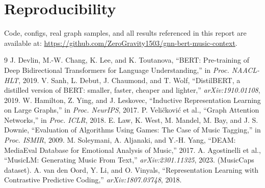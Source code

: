 \documentclass[conference]{IEEEtran}
\begin{document}
\section{Reproducibility}
Code, configs, real graph samples, and all results referenced in this
report are available at: \url{https://github.com/ZeroGravity1503/gnn-bert-music-context}.

\begin{thebibliography}{9}
 J. Devlin, M.-W. Chang, K. Lee, and K. Toutanova, ``BERT: Pre-training of Deep Bidirectional Transformers for Language Understanding,'' in \textit{Proc. NAACL-HLT}, 2019.
 V. Sanh, L. Debut, J. Chaumond, and T. Wolf, ``DistilBERT, a distilled version of BERT: smaller, faster, cheaper and lighter,'' \textit{arXiv:1910.01108}, 2019.
 W. Hamilton, Z. Ying, and J. Leskovec, ``Inductive Representation Learning on Large Graphs,'' in \textit{Proc. NeurIPS}, 2017.
 P. Veli\v{c}kovi\'{c} et al., ``Graph Attention Networks,'' in \textit{Proc. ICLR}, 2018.
 E. Law, K. West, M. Mandel, M. Bay, and J. S. Downie, ``Evaluation of Algorithms Using Games: The Case of Music Tagging,'' in \textit{Proc. ISMIR}, 2009.
 M. Soleymani, A. Aljanaki, and Y.-H. Yang, ``DEAM: MediaEval Database for Emotional Analysis of Music,'' 2017.
 A. Agostinelli et al., ``MusicLM: Generating Music From Text,'' \textit{arXiv:2301.11325}, 2023. (MusicCaps dataset).
 A. van den Oord, Y. Li, and O. Vinyals, ``Representation Learning with Contrastive Predictive Coding,'' \textit{arXiv:1807.03748}, 2018.
\end{thebibliography}
\end{document}
